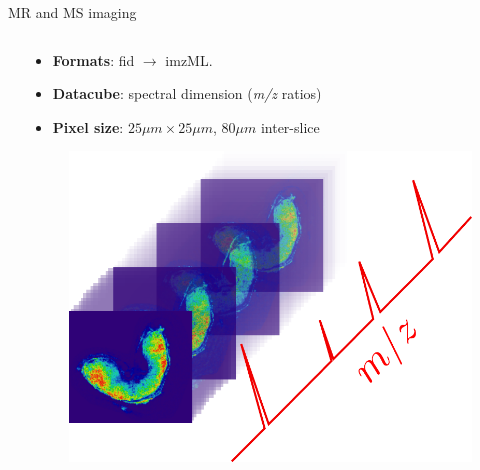 \documentclass[10pt]{beamer}
\begin{document}
\begin{frame}{MR and MS imaging}
\begin{columns}
\begin{column}[t]{.5\textwidth}
    \end{column}
    \begin{column}[t]{.5\textwidth}
      \begin{itemize}
      \item \textbf{Formats}: fid $\rightarrow$ imzML.
      \item \textbf{Datacube}: spectral dimension (\textit{m/z} ratios)
      \item \textbf{Pixel size}: $25 \mu m \times 25 \mu m$, $80 \mu m$ inter-slice
      \end{itemize}
      \begin{figure}[ht]
        \centering
        \includegraphics[width=0.5\linewidth]{fig/maldi_cube}
      \end{figure}
    \end{column}
  \end{columns}
\end{frame}








  
\end{document}
